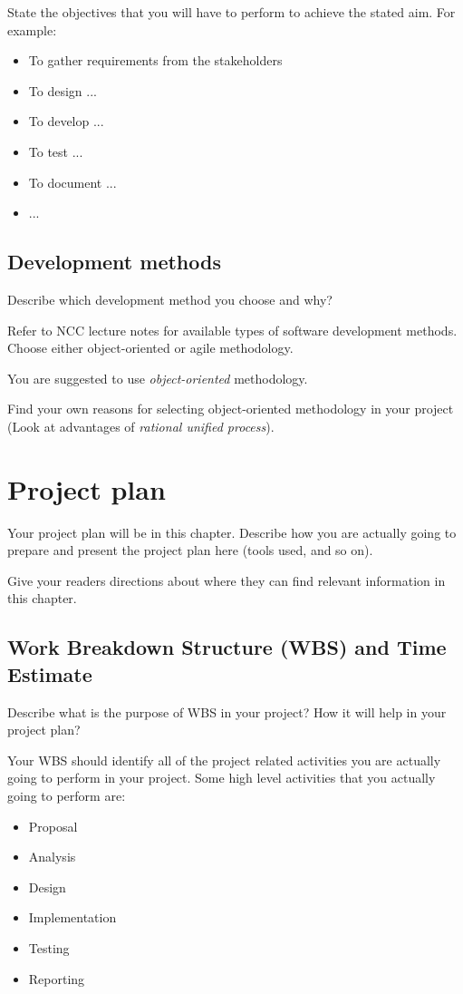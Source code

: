 \documentclass[12pt, a4paper]{report}
\begin{document}
State the objectives that you will have to perform to achieve the stated aim. For example:
\begin{itemize}
  \item To gather requirements from the stakeholders
  \item To design ...
  \item To develop ...
  \item To test ...
  \item To document ...
  \item ...
\end{itemize}

\section{Development methods} %
\label{sec:development_methods}
Describe which development method you choose and why?

Refer to NCC lecture notes for available types of software development methods. Choose either object-oriented or agile methodology.

You are suggested to use \emph{object-oriented} methodology.

Find your own reasons for selecting object-oriented methodology in your project (Look at advantages of \emph{rational unified process}). 

\chapter{Project plan} %
\label{cha:project_plan}
Your project plan will be in this chapter. Describe how you are actually going to prepare and present the project plan here (tools used, and so on).

Give your readers directions about where they can find relevant information in this chapter.

\section{Work Breakdown Structure (WBS) and Time Estimate} %
\label{sec:work_breakdown_structure}
Describe what is the purpose of WBS in your project? How it will help in your project plan?

Your WBS should identify all of the project related activities you are actually going to perform in your project. Some high level activities that you actually going to perform are:
\begin{itemize}
  \item Proposal
  \item Analysis
  \item Design
  \item Implementation
  \item Testing
  \item Reporting
\end{itemize}
\end{document}
